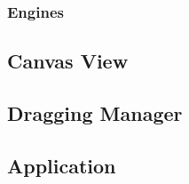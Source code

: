 
\subsubsection{Engines}




\subsection{Canvas View}




\subsection{Dragging Manager}


\subsection{Application}
